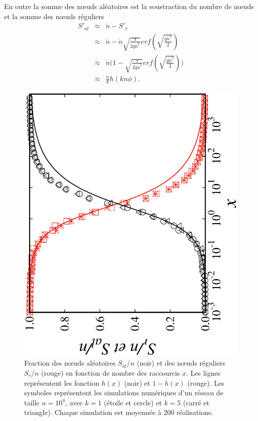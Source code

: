 En outre la somme des nœuds aléatoires est la soustraction du nombre de nœuds et la somme des nœuds
réguliers 
\begin{eqnarray}
S'_{al}&\approx&\acute{n}-S'_r\\\nonumber
&\approx& \acute{n}-\acute{n}\sqrt{\frac{\pi}{2q\acute{n}^2}}erf(\sqrt{\frac{q\acute{n}^2}{2}})  \\\nonumber
&\approx& \acute{n}\Big(1-\sqrt{\frac{\pi}{2q\acute{n}^2}}erf(\sqrt{\frac{q\acute{n}^2}{2}})\Big)  \\\nonumber
&\approx& \frac{n}{k}h(kn\phi).\nonumber
\end{eqnarray}
\begin{figure}[h!]
	\centering
	\includegraphics[scale=0.5,angle=-90]{./figures/fig-s}
	\caption{Fraction des nœuds aléatoires $S_{al}/n$ 
		(noir) et des nœuds réguliers $S_{r}/n$ (rouge)  en fonction de nombre des raccourcis $x$. Les lignes représentent les fonction $h(x)$  (noir) et $1-h(x)$ (rouge). Les symboles représentent les simulations numériques d'un réseau de taille $n=10^4$, avec
		$k=1$ (étoile et cercle) et $k=5$ (carré et triangle). Chaque simulation est moyennée à $200$ réalisations.}
	\label{S}
\end{figure}

